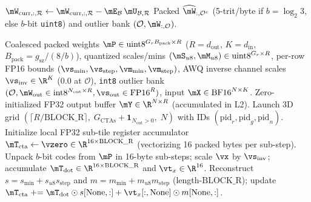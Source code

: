 \documentclass[10pt]{article} %
\begin{document}
\begin{algorithm}[htbp]
\begin{algorithmic}[1]
        \State $\mW_{\text{curr},:,\mathcal{R}} \gets \mW_{\text{curr},:,\mathcal{R}} - \mE_{\mathcal{B}}\,\mU_{\mathcal{B},\mathcal{R}}$ 
    \EndIf
\EndFor
\State \Return Packed $\widehat{\mW}_{:,\mathcal{O}^c}$ (5-trit/byte if $b = \log_2 3$, else $b$-bit \texttt{uint8}) and outlier bank $(\mathcal{O}, \mW_{:,\mathcal{O}})$.
\end{algorithmic}
\end{algorithm}

\begin{algorithm}[htbp]
\caption{Deferred-reduction Split-K fused Triton linear kernel for $N=1$ decode}
\label{alg:triton}
\small
\begin{algorithmic}[1]
\Require Coalesced packed weights $\mP \in \text{uint8}^{G_r B_{\text{pack}} \times R}$ ($R = d_{\text{out}}$, $K = d_{\text{in}}$, $B_{\text{pack}} = g_{\text{sz}} / (8/b)$), quantized scales/mins $(\mS_{u8}, \mM_{u8}) \in \text{uint8}^{G_r \times R}$, per-row FP16 bounds $(\vs_{\min}, \vs_{\text{step}}, \vm_{\min}, \vm_{\text{step}})$, AWQ inverse channel scales $\vs_{\text{inv}} \in \R^K$ ($0.0$ at $\mathcal{O}$), \texttt{int8} outlier bank $(\mathcal{O}, \mW_{\text{out}} \in \text{int8}^{N_{\text{out}} \times R}, \vs_{\text{out}} \in \text{FP16}^R)$, input $\mX \in \text{BF16}^{N \times K}$.
\Ensure Zero-initialized FP32 output buffer $\mY \in \R^{N \times R}$ (accumulated in L2).
\State Launch 3D grid $(\lceil R / \text{BLOCK\_R}\rceil,\; G_{\text{CTAs}} + \mathbf{1}_{N_{\text{out}}>0},\; N)$ with IDs $(\text{pid}_r, \text{pid}_g, \text{pid}_n)$.
\State Initialize local FP32 sub-tile register accumulator $\mT_{\text{cta}} \gets \vzero \in \R^{16 \times \text{BLOCK\_R}}$ (vectorizing 16 packed bytes per sub-step).
    \For{each group $g \in [\text{pid}_g \cdot \text{GROUPS\_PER\_CTA},\; \min((\text{pid}_g+1)\cdot \text{GROUPS\_PER\_CTA}, G_r))$}
        \State Unpack $b$-bit codes from $\mP$ in 16-byte sub-steps; scale $\vx$ by $\vs_{\text{inv}}$; accumulate $\mT_{\text{dot}} \in \R^{16 \times \text{BLOCK\_R}}$ and $\vt_x \in \R^{16}$.
        \State Reconstruct $s = s_{\min} + s_{u8} s_{\text{step}}$ and $m = m_{\min} + m_{u8} m_{\text{step}}$ (length-$\text{BLOCK\_R}$); update $\mT_{\text{cta}} \mathrel{+}= \mT_{\text{dot}} \odot s[\mathrm{None},:] + \vt_x[:,\mathrm{None}] \odot m[\mathrm{None},:]$.
    \EndFor
{}

\end{algorithmic}
\end{algorithm}
\end{document}
